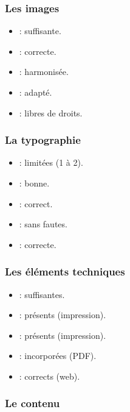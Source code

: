 \subsubsection{Les images}

\begin{itemize}
    \item {} : suffisante.
    \item {} : correcte.
    \item {} : harmonisée.
    \item {} : adapté.
    \item {} : libres de droits.
\end{itemize}

\subsubsection{La typographie}

\begin{itemize}
    \item {} : limitées (1 à 2).
    \item {} : bonne.
    \item {} : correct.
    \item {} : sans fautes.
    \item {} : correcte.
\end{itemize}

\subsubsection{Les éléments techniques}

\begin{itemize}
    \item {} : suffisantes.
    \item {} : présents (impression).
    \item {} : présents (impression).
    \item {} : incorporées (PDF).
    \item {} : corrects (web).
\end{itemize}

\subsubsection{Le contenu}

